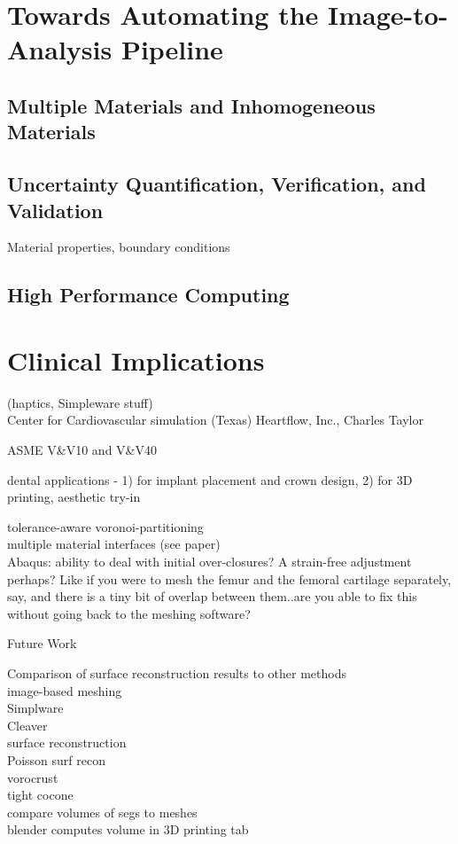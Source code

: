 \section{Towards Automating the Image-to-Analysis Pipeline}
\label{Towards Automating the Image-to-Analysis Pipeline}
\subsection{Multiple Materials and Inhomogeneous Materials}
\label{Multiple Materials and Inhomogeneous Materials}
\subsection{Uncertainty Quantification, Verification, and Validation}
\label{Uncertainty Quantification, Verification, and Validation}
Material properties, boundary conditions
\subsection{High Performance Computing}
\label{High Performance Computing}
\section{Clinical Implications}
\label{Clinical Implications}
(haptics, Simpleware stuff)\\
Center for Cardiovascular simulation (Texas)
Heartflow, Inc., Charles Taylor

ASME V\&V10 and V\&V40

dental applications - 1) for implant placement and crown design, 2) for 3D printing, aesthetic try-in 

tolerance-aware voronoi-partitioning \\
multiple material interfaces (see paper) \\

Abaqus: ability to deal with initial over-closures? A strain-free adjustment perhaps? Like if you were to mesh the femur and the femoral cartilage separately, say, and there is a tiny bit of overlap between them..are you able to fix this without going back to the meshing software?  

Future Work

Comparison of surface reconstruction results to other methods \\
image-based meshing \\
Simplware \\
Cleaver \\
surface reconstruction \\
Poisson surf recon \\
vorocrust \\
tight cocone \\
compare volumes of segs to meshes \\
blender computes volume in 3D printing tab \\

